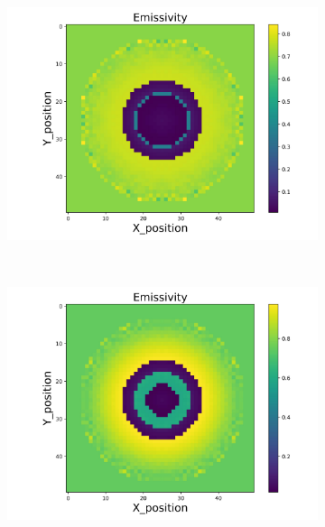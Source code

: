 \begin{figure}[p]
\begin{minipage}{\textwidth}
        \begin{subfigure}{0.325\textwidth}
            \centering
            \includegraphics[width=\textwidth]{figures/raw_data/21/quad/emi_cal.jpg}
        \end{subfigure}
    \end{minipage}\\
    \begin{minipage}{\textwidth}
        \centering
        \begin{subfigure}{0.325\textwidth}
            \centering
            \includegraphics[width=\textwidth]{figures/raw_data/22/quad/emi_cal.jpg}
        \end{subfigure}

\end{minipage}
\end{figure}
